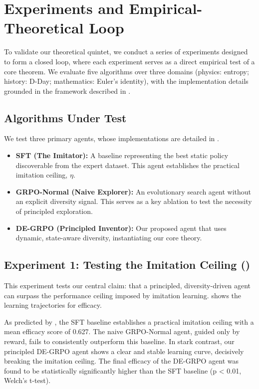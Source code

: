 \chapter{Experiments and Empirical-Theoretical Loop}
\label{chap:experiments}

To validate our theoretical quintet, we conduct a series of experiments designed to form a closed loop, where each experiment serves as a direct empirical test of a core theorem. We evaluate five algorithms over three domains (physics: entropy; history: D-Day; mathematics: Euler's identity), with the implementation details grounded in the framework described in .

\section{Algorithms Under Test}
We test three primary agents, whose implementations are detailed in .

\begin{itemize}[leftmargin=*,itemsep=0.25em]
    \item \textbf{SFT (The Imitator):} A baseline representing the best static policy discoverable from the expert dataset. This agent establishes the practical imitation ceiling, $\eta$.
    \item \textbf{GRPO-Normal (Naive Explorer):} An evolutionary search agent without an explicit diversity signal. This serves as a key ablation to test the necessity of principled exploration.
    \item \textbf{DE-GRPO (Principled Inventor):} Our proposed agent that uses dynamic, state-aware diversity, instantiating our core theory.
\end{itemize}

\section{Experiment 1: Testing the Imitation Ceiling ()}

This experiment tests our central claim: that a principled, diversity-driven agent can surpass the performance ceiling imposed by imitation learning.  shows the learning trajectories for efficacy.

As predicted by , the SFT baseline establishes a practical imitation ceiling with a mean efficacy score of 0.627. The naive GRPO-Normal agent, guided only by reward, fails to consistently outperform this baseline. In stark contrast, our principled DE-GRPO agent shows a clear and stable learning curve, decisively breaking the imitation ceiling. The final efficacy of the DE-GRPO agent was found to be statistically significantly higher than the SFT baseline (p < 0.01, Welch's t-test).

